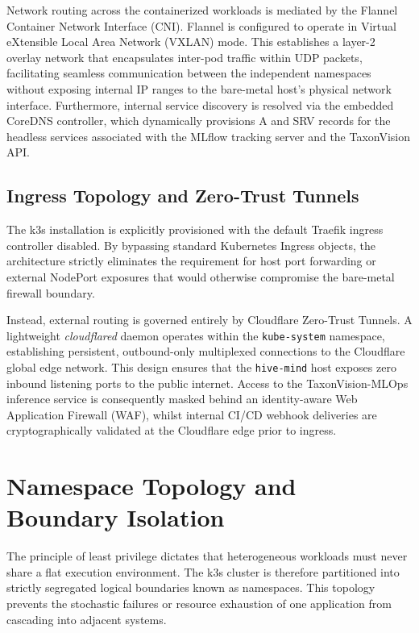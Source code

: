 Network routing across the containerized workloads is mediated by the Flannel Container Network Interface (CNI). Flannel is configured to operate in Virtual eXtensible Local Area Network (VXLAN) mode. This establishes a layer-2 overlay network that encapsulates inter-pod traffic within UDP packets, facilitating seamless communication between the independent namespaces without exposing internal IP ranges to the bare-metal host's physical network interface. Furthermore, internal service discovery is resolved via the embedded CoreDNS controller, which dynamically provisions A and SRV records for the headless services associated with the MLflow tracking server and the TaxonVision API.

\subsection{Ingress Topology and Zero-Trust Tunnels}
The k3s installation is explicitly provisioned with the default Traefik ingress controller disabled. By bypassing standard Kubernetes Ingress objects, the architecture strictly eliminates the requirement for host port forwarding or external NodePort exposures that would otherwise compromise the bare-metal firewall boundary.

Instead, external routing is governed entirely by Cloudflare Zero-Trust Tunnels. A lightweight \textit{cloudflared} daemon operates within the \texttt{kube-system} namespace, establishing persistent, outbound-only multiplexed connections to the Cloudflare global edge network. This design ensures that the \texttt{hive-mind} host exposes zero inbound listening ports to the public internet. Access to the TaxonVision-MLOps inference service is consequently masked behind an identity-aware Web Application Firewall (WAF), whilst internal CI/CD webhook deliveries are cryptographically validated at the Cloudflare edge prior to ingress.

\section{Namespace Topology and Boundary Isolation}
\label{sec:namespace_topology}

The principle of least privilege dictates that heterogeneous workloads must never share a flat execution environment. The k3s cluster is therefore partitioned into strictly segregated logical boundaries known as namespaces. This topology prevents the stochastic failures or resource exhaustion of one application from cascading into adjacent systems.

